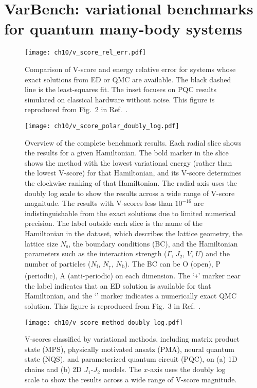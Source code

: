\chapter{VarBench: variational benchmarks for quantum many-body systems}
\label{ch:varbench}


\begin{figure}[htb]
\centering
\texttt{[image: ch10/v\_score\_rel\_err.pdf]}
\caption[Comparison of V-score and energy relative error]{
Comparison of V-score and energy relative error for systems whose exact solutions from ED or QMC are available.
The black dashed line is the least-squares fit.
The inset focuses on PQC results simulated on classical hardware without noise.
This figure is reproduced from Fig.~2 in Ref.~\cite{wu2023variational}.
}
\label{fig:v-score-rel-err}
\end{figure}

\begin{figure}[htb]
\centering
\hspace*{-0.05\linewidth}
\texttt{[image: ch10/v\_score\_polar\_doubly\_log.pdf]}
\caption[Overview of VarBench results]{
Overview of the complete benchmark results.
Each radial slice shows the results for a given Hamiltonian. The bold marker in the slice shows the method with the lowest variational energy (rather than the lowest V-score) for that Hamiltonian, and its V-score determines the clockwise ranking of that Hamiltonian.
The radial axis uses the doubly log scale to show the results across a wide range of V-score magnitude.
The results with V-scores less than $10^{-16}$ are indistinguishable from the exact solutions due to limited numerical precision.
The label outside each slice is the name of the Hamiltonian in the dataset, which describes the lattice geometry, the lattice size $N_\text{s}$, the boundary conditions (BC), and the Hamiltonian parameters such as the interaction strength ($\Gamma$, $J_2$, $V$, $U$) and the number of particles ($N_\mathrm{f}$, $N_{\uparrow}$, $N_\mathrm{b}$).
The BC can be O (open), P (periodic), A (anti-periodic) on each dimension.
The `\texttt{+}' marker near the label indicates that an ED solution is available for that Hamiltonian, and the `\texttt{\textasteriskcentered}' marker indicates a numerically exact QMC solution.
This figure is reproduced from Fig.~3 in Ref.~\cite{wu2023variational}.
}
\label{fig:v-score}
\end{figure}

\begin{figure}[htb]
\centering
\texttt{[image: ch10/v\_score\_method\_doubly\_log.pdf]}
\caption[V-scores of different methods]{
V-scores classified by variational methods, including matrix product state (MPS), physically motivated ansatz (PMA), neural quantum state (NQS), and parameterized quantum circuit (PQC), on (a) 1D chains and (b) 2D $J_1$-$J_2$ models.
The $x$-axis uses the doubly log scale to show the results across a wide range of V-score magnitude.
}
\label{fig:v-score-method}
\end{figure}

